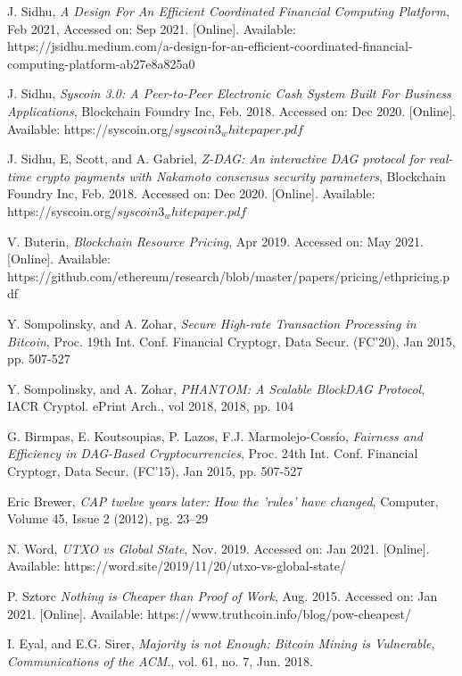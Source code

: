 \documentclass{ctexart}
\begin{document}
\begin{thebibliography}{00}

 J. Sidhu, \textit{A Design For An Efficient Coordinated Financial Computing Platform}, Feb 2021, Accessed on: Sep 2021.  [Online]. Available:  https://jsidhu.medium.com/a-design-for-an-efficient-coordinated-financial-computing-platform-ab27e8a825a0

 J. Sidhu, \textit{Syscoin 3.0: A Peer-to-Peer Electronic Cash System Built For Business Applications}, Blockchain Foundry Inc, Feb. 2018. Accessed on: Dec 2020. [Online]. Available: https://syscoin.org/$syscoin3_whitepaper.pdf$

 J. Sidhu, E, Scott, and A. Gabriel, \textit{Z-DAG: An interactive DAG protocol for real-time crypto payments with Nakamoto consensus security parameters}, Blockchain Foundry Inc, Feb. 2018. Accessed on: Dec 2020. [Online]. Available: https://syscoin.org/$syscoin3_whitepaper.pdf$

 V. Buterin,  \textit{Blockchain Resource Pricing}, Apr 2019. Accessed on: May 2021. [Online]. Available: https://github.com/ethereum/research/blob/master/papers/pricing/ethpricing.pdf

 Y. Sompolinsky, and A. Zohar, \textit{Secure High-rate Transaction Processing in Bitcoin}, Proc. 19th Int. Conf. Financial Cryptogr, Data Secur. (FC’20), Jan 2015, pp. 507-527

 Y. Sompolinsky, and A. Zohar, \textit{PHANTOM: A Scalable BlockDAG Protocol}, IACR Cryptol. ePrint Arch., vol 2018, 2018,  pp. 104

 G. Birmpas, E. Koutsoupias, P. Lazos, F.J. Marmolejo-Cossío, \textit{Fairness and Efficiency in DAG-Based Cryptocurrencies}, Proc. 24th Int. Conf. Financial Cryptogr, Data Secur. (FC’15), Jan 2015, pp. 507-527

 Eric Brewer, \textit{CAP twelve years later: How the 'rules' have changed}, Computer, Volume 45, Issue 2 (2012), pg. 23–29

 N. Word, \textit{UTXO vs Global State}, Nov. 2019. Accessed on: Jan 2021. [Online]. Available: https://word.site/2019/11/20/utxo-vs-global-state/

 P. Sztorc \textit{Nothing is Cheaper than Proof of Work}, Aug. 2015. Accessed on: Jan 2021. [Online]. Available: https://www.truthcoin.info/blog/pow-cheapest/

 I. Eyal, and E.G. Sirer, \textit{Majority is not Enough: Bitcoin Mining is Vulnerable}, \emph{Communications of the ACM}., vol. 61, no. 7, Jun. 2018.


\end{thebibliography}
\end{document}
